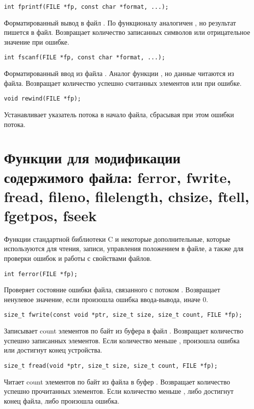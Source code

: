 \begin{verbatim}
int fprintf(FILE *fp, const char *format, ...);
\end{verbatim}
Форматированный вывод в файл . По функционалу аналогичен , но результат пишется в файл. Возвращает количество записанных символов или отрицательное значение при ошибке.

\begin{verbatim}
int fscanf(FILE *fp, const char *format, ...);
\end{verbatim}
Форматированный ввод из файла . Аналог функции , но данные читаются из файла. Возвращает количество успешно считанных элементов или  при ошибке.

\begin{verbatim}
void rewind(FILE *fp);
\end{verbatim}
Устанавливает указатель потока  в начало файла, сбрасывая при этом ошибки потока.


\section{Функции для модификации содержимого файла: ferror, fwrite, fread, fileno, filelength, chsize, ftell, fgetpos, fseek}
Функции стандартной библиотеки C и некоторые дополнительные, которые используются для чтения, записи, 
управления положением в файле, а также для проверки ошибок и работы с свойствами файлов.

\begin{verbatim}
int ferror(FILE *fp);
\end{verbatim}
Проверяет состояние ошибки файла, связанного с потоком . Возвращает ненулевое значение, если произошла ошибка ввода-вывода, иначе 0.

\begin{verbatim}
size_t fwrite(const void *ptr, size_t size, size_t count, FILE *fp);
\end{verbatim}
Записывает count элементов по  байт из буфера  в файл . Возвращает количество успешно записанных элементов. Если количество меньше , произошла ошибка или достигнут конец устройства.

\begin{verbatim}
size_t fread(void *ptr, size_t size, size_t count, FILE *fp);
\end{verbatim}
Читает count элементов по  байт из файла  в буфер . Возвращает количество успешно прочитанных элементов. Если количество меньше , либо достигнут конец файла, либо произошла ошибка.

